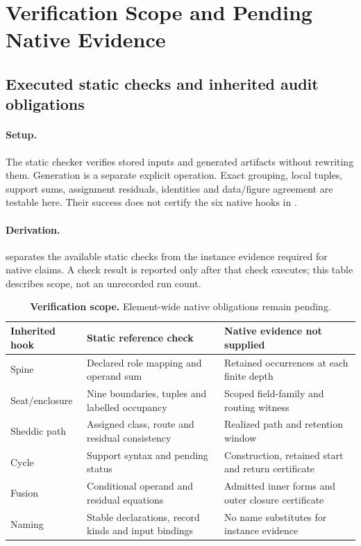 \section{Verification Scope and Pending Native Evidence}\label{sec:audits-and-falsification}

\subsection{Executed static checks and inherited audit obligations}\label{subsec:six-audit-hooks}
\paragraph{Setup.}
The static checker verifies stored inputs and generated artifacts without rewriting them. Generation is a separate explicit operation. Exact grouping, local tuples, support sums, assignment residuals, identities and data/figure agreement are testable here. Their success does not certify the six native hooks in .

\paragraph{Derivation.}
 separates the available static checks from the instance evidence required for native claims. A check result is reported only after that check executes; this table describes scope, not an unrecorded run count.
\begin{table}[H]
\centering
\small
\caption{\textbf{Verification scope.} Element-wide native obligations remain pending.}
\label{tab:matter1-audit-summary}
\begin{tabularx}{\textwidth}{@{}p{}XX@{}}
\toprule
Inherited hook & Static reference check & Native evidence not supplied\\
\midrule
Spine & Declared role mapping and operand sum & Retained occurrences at each finite depth\\
Seat/enclosure & Nine boundaries, tuples and labelled occupancy & Scoped field-family and routing witness\\
Sheddic path & Assigned class, route and residual consistency & Realized path and retention window\\
Cycle & Support syntax and pending status & Construction, retained start and return certificate\\
Fusion & Conditional operand and residual equations & Admitted inner forms and outer closure certificate\\
Naming & Stable declarations, record kinds and input bindings & No name substitutes for instance evidence\\
\bottomrule
\end{tabularx}
\end{table}

